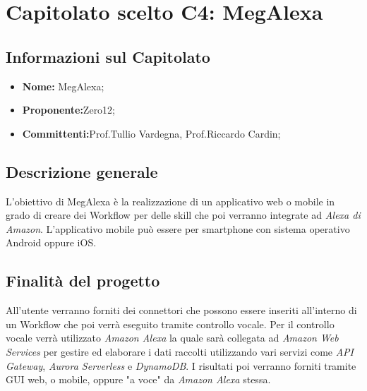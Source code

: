 
\chapter{Capitolato scelto C4: MegAlexa}
\section{Informazioni sul Capitolato}
\begin{itemize}
 \item \textbf{Nome:} MegAlexa;
\item \textbf{Proponente:}Zero12;
\item \textbf{Committenti:}Prof.Tullio Vardegna, Prof.Riccardo Cardin;
\end{itemize}

\section{Descrizione generale}
L'obiettivo di MegAlexa è la  realizzazione di un applicativo web o mobile in grado di creare dei Workflow per delle skill che poi verranno integrate ad \emph{Alexa di Amazon}.
L'applicativo mobile può essere per smartphone con sistema operativo Android oppure iOS.
\section{Finalit\`a del progetto}
All'utente verranno forniti dei connettori che possono essere inseriti all'interno di un Workflow che poi verrà eseguito tramite controllo vocale.  
Per il controllo vocale verrà utilizzato \emph{Amazon Alexa} la quale sarà collegata ad \emph{Amazon Web Services} per gestire ed elaborare i dati raccolti utilizzando vari servizi come \emph{API Gateway}, \emph{Aurora Serverless} e \emph{DynamoDB}.
I risultati poi verranno forniti tramite GUI web, o mobile, oppure "a voce" da \emph{Amazon Alexa} stessa.
